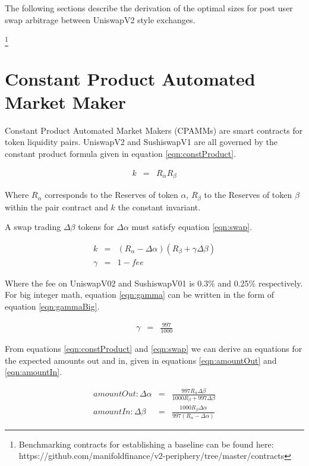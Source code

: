 \documentclass[runningheads]{llncs}
\begin{document}
    
	
	The following sections describe the derivation of the optimal sizes for post user swap arbitrage between UniswapV2 style exchanges.
	
	\footnote{Benchmarking contracts for establishing a baseline can be found here: https://github.com/manifoldfinance/v2-periphery/tree/master/contracts }
	
	

	
	\section{Constant Product Automated Market Maker}
	Constant Product Automated Market Makers (CPAMMs) are smart contracts for token liquidity pairs. UniswapV2 and SushiswapV1 are all governed by the constant product formula given in equation \ref{eqn:constProduct}. 
	
	\begin{eqnarray}
		k  &=& R_{\alpha}  R_{\beta}  \label{eqn:constProduct}
	\end{eqnarray}
	
	Where \(R_{\alpha}\) corresponds to the Reserves of token \(\alpha\), \(R_{\beta}\) to the Reserves of token \(\beta\) within the pair contract and \( k \) the constant invariant. 
	
	A swap trading \( \Delta\beta\) tokens for \( \Delta\alpha \) must satisfy equation \ref{eqn:swap}.
	
	\begin{eqnarray}
		k  &=& (R_{\alpha} - \Delta\alpha)  (R_{\beta} + \gamma\Delta\beta ) \label{eqn:swap}\\
		\gamma  &=& 1 - fee \label{eqn:gamma}
	\end{eqnarray}
	
	Where the fee on UniswapV02 and SushiswapV01 is 0.3\% and 0.25\% respectively. For big integer math, equation \ref{eqn:gamma} can be written in the form of equation \ref{eqn:gammaBig}.
	
	\begin{eqnarray}
		\gamma  &=& \frac{997}{1000} \label{eqn:gammaBig}
	\end{eqnarray}
	
	From equations \ref{eqn:constProduct} and \ref{eqn:swap} we can derive an equations for the expected amounts out and in, given in equations \ref{eqn:amountOut} and \ref{eqn:amountIn}. 
	
	\begin{eqnarray}
		amountOut: \Delta\alpha  &=& \frac{997 R_{\alpha} \Delta\beta }{1000 R_{\beta} + 997 \Delta\beta} \label{eqn:amountOut}\\
		amountIn: \Delta\beta  &=& \frac{1000 R_{\beta} \Delta\alpha }{997 (R_{\alpha} - \Delta\alpha)} \label{eqn:amountIn}
	\end{eqnarray}
	
\end{document}
